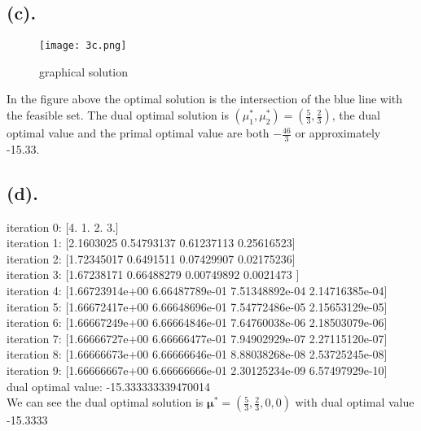 \documentclass[12pt,letterpaper]{article}
\begin{document}
\subsection*{(c).}
\begin{figure}[h]
\centering
\texttt{[image: 3c.png]}
\caption{graphical solution}
\label{graphsolution}
\end{figure}
In the figure above the optimal solution is the intersection of the blue line with the feasible set. The dual optimal solution is $(\mu_1^*,\mu_2^*)=(\frac{5}{3},\frac{2}{3})$, the dual optimal value and the primal optimal value are both $-\frac{46}{3}$ or approximately -15.33.
\subsection*{(d).}
iteration 0: [4. 1. 2. 3.]\\
iteration 1: [2.1603025  0.54793137 0.61237113 0.25616523]\\
iteration 2: [1.72345017 0.6491511  0.07429907 0.02175236]\\
iteration 3: [1.67238171 0.66488279 0.00749892 0.0021473 ]\\
iteration 4: [1.66723914e+00 6.66487789e-01 7.51348892e-04 2.14716385e-04]\\
iteration 5: [1.66672417e+00 6.66648696e-01 7.54772486e-05 2.15653129e-05]\\
iteration 6: [1.66667249e+00 6.66664846e-01 7.64760038e-06 2.18503079e-06]\\
iteration 7: [1.66666727e+00 6.66666477e-01 7.94902929e-07 2.27115120e-07]\\
iteration 8: [1.66666673e+00 6.66666646e-01 8.88038268e-08 2.53725245e-08]\\
iteration 9: [1.66666667e+00 6.66666666e-01 2.30125234e-09 6.57497929e-10]\\
dual optimal value: -15.333333339470014\\
We can see the dual optimal solution is $\boldsymbol{\mu}^*=(\frac{5}{3},\frac{2}{3},0,0)$ with dual optimal value -15.3333
\end{document}
